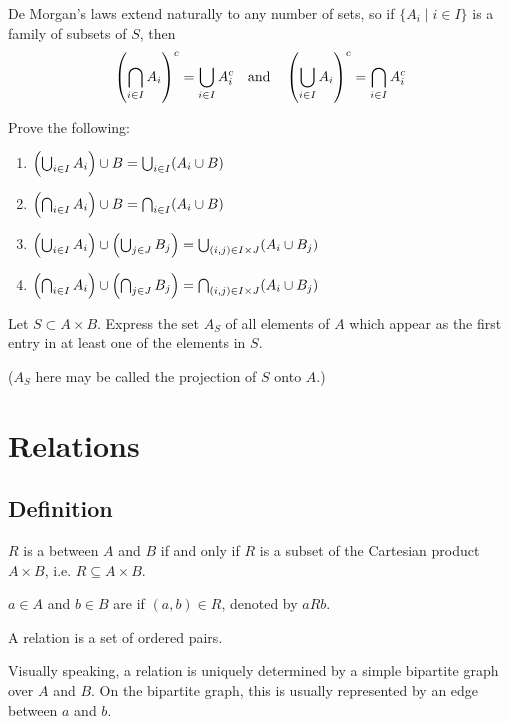 De Morgan’s laws extend naturally to any number of sets, so if $\{A_i \mid i \in I\}$ is a family of subsets of $S$, then
\[ \left(\bigcap_{i\in I}A_i\right)^c = \bigcup_{i\in I}A_i^c \quad \text{and} \quad \left(\bigcup_{i\in I}A_i\right)^c = \bigcap_{i\in I}A_i^c \]

\begin{exercise}{}{}
Prove the following:
\begin{enumerate}
\item $\left(\bigcup_{i\in I}A_i\right)\cup B=\bigcup_{i\in I}(A_i\cup B)$
\item $\left(\bigcap_{i\in I}A_i\right)\cup B=\bigcap_{i\in I}(A_i\cup B)$
\item $\left(\bigcup_{i\in I}A_i\right)\cup\left(\bigcup_{j\in J}B_j\right)=\bigcup_{(i,j)\in I\times J}(A_i\cup B_j)$
\item $\left(\bigcap_{i\in I}A_i\right)\cup\left(\bigcap_{j\in J}B_j\right)=\bigcap_{(i,j)\in I\times J}(A_i\cup B_j)$
\end{enumerate}
\end{exercise}

\begin{exercise}{}{}
Let $S\subset A\times B$. Express the set $A_S$ of all elements of $A$ which appear as the first entry in at least one of the elements in $S$.

($A_S$ here may be called the projection of $S$ onto $A$.)
\end{exercise}
\pagebreak

\section{Relations}
\subsection{Definition}
\begin{definition}
$R$ is a  between $A$ and $B$ if and only if $R$ is a subset of the Cartesian product $A \times B$, i.e. $R \subseteq A \times B$.

$a \in A$ and $b \in B$ are  if $(a,b) \in R$, denoted by $a R b$.
\end{definition}

\begin{remark}
A relation is a set of ordered pairs.
\end{remark}

Visually speaking, a relation is uniquely determined by a simple bipartite graph over $A$ and $B$. On the bipartite graph, this is usually represented by an edge between $a$ and $b$.


